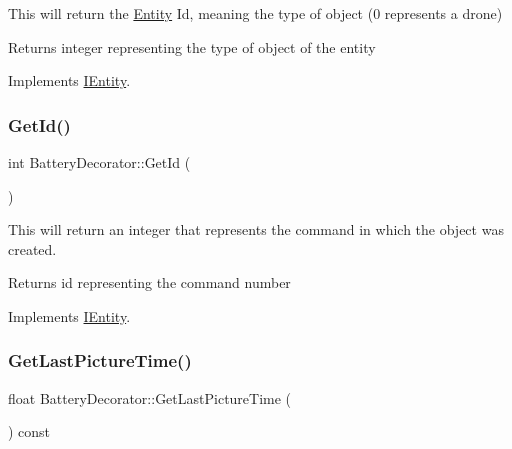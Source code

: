 This will return the \hyperlink{classEntity}{Entity} Id, meaning the type of object (0 represents a drone) 

\begin{DoxyReturn}{Returns}
integer representing the type of object of the entity 
\end{DoxyReturn}


Implements \hyperlink{classIEntity_a4359ee47413fa0b2940b3b0336e13861}{I\+Entity}.

\mbox{\label{classBatteryDecorator_a0a9d1aedcbbff75c0a88612cb4604fb3}} 
\subsubsection{\texorpdfstring{Get\+Id()}{GetId()}}
{\footnotesize\ttfamily int Battery\+Decorator\+::\+Get\+Id (\begin{DoxyParamCaption}{ }\end{DoxyParamCaption})\hspace{0.3cm}{\ttfamily [virtual]}}



This will return an integer that represents the command in which the object was created. 

\begin{DoxyReturn}{Returns}
id representing the command number 
\end{DoxyReturn}


Implements \hyperlink{classIEntity_ac3d60cc2fab1ccb61c1be92373e636d9}{I\+Entity}.

\mbox{\label{classBatteryDecorator_a661b3722c37ce7d9690e50724eac863e}} 
\subsubsection{\texorpdfstring{Get\+Last\+Picture\+Time()}{GetLastPictureTime()}}
{\footnotesize\ttfamily float Battery\+Decorator\+::\+Get\+Last\+Picture\+Time (\begin{DoxyParamCaption}{ }\end{DoxyParamCaption}) const\hspace{0.3cm}{\ttfamily [virtual]}}




